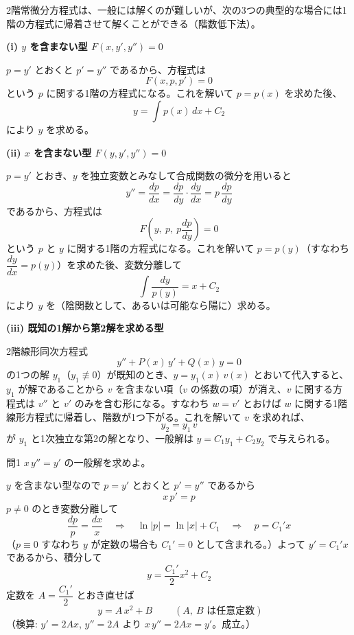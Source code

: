 \documentclass[a4paper,11pt]{article}
\begin{document}


\noindent
2階常微分方程式は、一般には解くのが難しいが、次の3つの典型的な場合には1階の方程式に帰着させて解くことができる（階数低下法）。

\medskip
\noindent
\textbf{(i) $y$ を含まない型 $F(x, y', y'') = 0$}

\noindent
$p = y'$ とおくと $p' = y''$ であるから、方程式は
\[
F(x, p, p') = 0
\]
という $p$ に関する1階の方程式になる。これを解いて $p = p(x)$ を求めた後、
\[
y = \int p(x)\,dx + C_{2}
\]
により $y$ を求める。

\medskip
\noindent
\textbf{(ii) $x$ を含まない型 $F(y, y', y'') = 0$}

\noindent
$p = y'$ とおき、$y$ を独立変数とみなして合成関数の微分を用いると
\[
y'' = \frac{dp}{dx} = \frac{dp}{dy}\cdot\frac{dy}{dx} = p\,\frac{dp}{dy}
\]
であるから、方程式は
\[
F\left(y,\ p,\ p\frac{dp}{dy}\right) = 0
\]
という $p$ と $y$ に関する1階の方程式になる。これを解いて $p = p(y)$（すなわち $\dfrac{dy}{dx} = p(y)$）を求めた後、変数分離して
\[
\int \frac{dy}{p(y)} = x + C_{2}
\]
により $y$ を（陰関数として、あるいは可能なら陽に）求める。

\medskip
\noindent
\textbf{(iii) 既知の1解から第2解を求める型}

\noindent
2階線形同次方程式
\[
y'' + P(x)\,y' + Q(x)\,y = 0
\]
の1つの解 $y_{1}$（$y_{1} \not\equiv 0$）が既知のとき、$y = y_{1}(x)\,v(x)$ とおいて代入すると、$y_{1}$ が解であることから $v$ を含まない項（$v$ の係数の項）が消え、$v$ に関する方程式は $v''$ と $v'$ のみを含む形になる。すなわち $w = v'$ とおけば $w$ に関する1階線形方程式に帰着し、階数が1つ下がる。これを解いて $v$ を求めれば、
\[
y_{2} = y_{1}\,v
\]
が $y_{1}$ と1次独立な第2の解となり、一般解は $y = C_{1} y_{1} + C_{2} y_{2}$ で与えられる。

\clearpage
\begin{mondaiboxS}{問1}
$x\,y'' = y'$ の一般解を求めよ。
\end{mondaiboxS}
\kaitou
$y$ を含まない型なので $p = y'$ とおくと $p' = y''$ であるから
\[
x\,p' = p
\]
$p \neq 0$ のとき変数分離して
\[
\frac{dp}{p} = \frac{dx}{x}
\quad\Longrightarrow\quad
\ln|p| = \ln|x| + C_{1}
\quad\Longrightarrow\quad
p = C_{1}' x
\]
（$p \equiv 0$ すなわち $y$ が定数の場合も $C_{1}' = 0$ として含まれる。）よって $y' = C_{1}' x$ であるから、積分して
\[
y = \frac{C_{1}'}{2}x^{2} + C_{2}
\]
定数を $A = \dfrac{C_{1}'}{2}$ とおき直せば
\[
\boxed{\; y = A\,x^{2} + B \;}
\qquad (A,\ B \text{ は任意定数})
\]
（検算: $y' = 2Ax$, $y'' = 2A$ より $x\,y'' = 2Ax = y'$。成立。）
\end{document}
